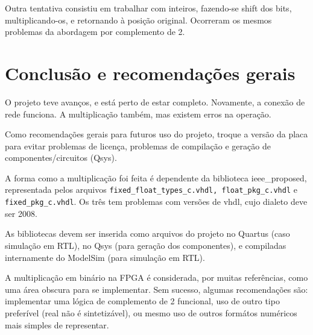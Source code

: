 \documentclass [12pt,oneside] {article}
\begin{document}
	Outra tentativa consistiu em trabalhar com inteiros,
fazendo-se shift dos bits, multiplicando-os, e retornando à posição
original. Ocorreram os mesmos problemas da abordagem por complemento
de 2.

\newpage
\section{Conclusão e recomendações gerais}

	O projeto teve avanços, e está perto de estar completo.
Novamente, a conexão de rede funciona. A multiplicação também, mas existem erros na
operação.

	Como recomendações gerais para futuros uso do projeto, troque
a versão da placa para evitar problemas de licença, problemas de
compilação e geração de componentes/circuitos (Qsys).

	A forma como a multiplicação foi feita é dependente da
biblioteca ieee\_proposed, representada pelos arquivos
\texttt{fixed\_float\_types\_c.vhdl, float\_pkg\_c.vhdl} e
\texttt{fixed\_pkg\_c.vhdl}. Os três tem problemas com versões de
vhdl, cujo dialeto deve ser 2008.

	As bibliotecas devem ser inserida como arquivos do projeto no
Quartus (caso simulação em RTL), no Qsys (para geração dos
componentes), e compiladas internamente do ModelSim (para simulação em
RTL).

	A multiplicação em binário na FPGA é considerada, por muitas
referências, como uma área obscura para se implementar. Sem sucesso,
algumas recomendações são: implementar uma lógica de complemento de 2
funcional, uso de outro tipo preferível (real não é sintetizável), ou
mesmo uso de outros formátos numéricos mais simples de representar.
\end{document}
